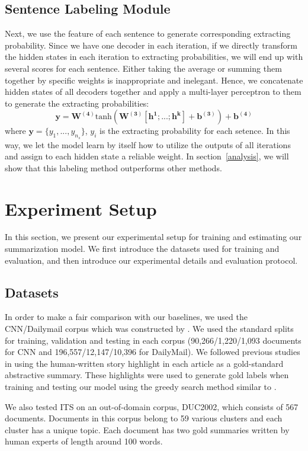 \documentclass[11pt,a4paper]{article}
\begin{document}
\subsection{Sentence Labeling Module}
Next, we use the feature of each sentence to generate corresponding extracting probability. Since we have one decoder in each iteration, if we directly transform the hidden states in each iteration to extracting probabilities, we will end up with several scores for each sentence.
Either taking the average or summing them together by specific weights is inappropriate and inelegant.
Hence, we concatenate hidden states of all decoders together and apply a multi-layer perceptron to them to generate the extracting probabilities: 
\begin{equation}
\bm{y}=\bm{W^{(4)}}\text{tanh}(\bm{W^{(3)}}[\bm{h^{1}};...;\bm{h^{k}}]+\bm{b^{(3)}})+\bm{b^{(4)}}
\end{equation}
where $\bm{y}=\{y_{1},...,y_{n_{s}}\}$, $y_{i}$ is the extracting probability for each setence.
In this way, we let the model learn by itself how to utilize the outputs of all iterations and assign to each hidden state a reliable weight.
In section~\ref{analysis}, we will show that this labeling method outperforms other methods.

 
\section{Experiment Setup}
In this section, we present our experimental setup for training and estimating our summarization model.
We first introduce the datasets used for training and evaluation, and then introduce our experimental details and evaluation protocol.
\subsection{Datasets}
In order to make a fair comparison with our baselines, we used the CNN/Dailymail corpus which was constructed by \citet{Hermann2015Teaching}.
We used the standard splits for training, validation and testing in each corpus (90,266/1,220/1,093 documents for CNN and 196,557/12,147/10,396 for DailyMail).
We followed previous studies in using the human-written story highlight in each article as a gold-standard abstractive summary.
These highlights were used to generate gold labels when training and testing our model using the greedy search method similar to  \cite{Nallapati2016SummaRuNNer}.


We also tested ITS on an out-of-domain corpus, DUC2002, which consists of 567 documents.
Documents in this corpus belong to 59 various clusters and each cluster has a unique topic. 
Each document has two gold summaries written by human experts of length around 100 words.
\end{document}

